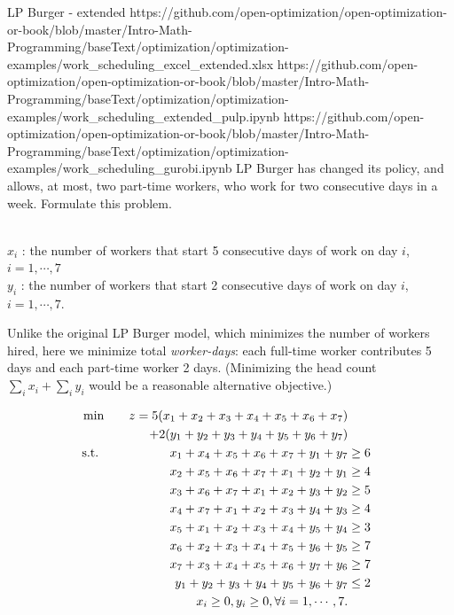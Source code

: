 \newpage
\begin{examplewithallcode}{LP Burger - extended}
{https://github.com/open-optimization/open-optimization-or-book/blob/master/Intro-Math-Programming/baseText/optimization/optimization-examples/work_scheduling_excel_extended.xlsx}
{https://github.com/open-optimization/open-optimization-or-book/blob/master/Intro-Math-Programming/baseText/optimization/optimization-examples/work_scheduling_extended_pulp.ipynb}
{https://github.com/open-optimization/open-optimization-or-book/blob/master/Intro-Math-Programming/baseText/optimization/optimization-examples/work_scheduling_gurobi.ipynb}
LP Burger has changed its policy, and allows, at most, two part-time workers, who work for two consecutive days in a week.  Formulate this problem.
\end{examplewithallcode}
\begin{solution}
 \\
$x_i$ : the number of workers that start 5 consecutive days of work on day $i$, $ i = 1,\cdots,7$ \\
$y_i$ : the number of workers that start 2 consecutive days of work on day $i$, $ i = 1,\cdots,7$.

Unlike the original LP Burger model, which minimizes the number of workers hired, here we minimize total \emph{worker-days}: each full-time worker contributes 5 days and each part-time worker 2 days. (Minimizing the head count $\sum_i x_i + \sum_i y_i$ would be a reasonable alternative objective.)

\smallskip {}
\begin{align*}
\min \quad && z = 5(x_1 + x_2 + x_3 + x_4 + x_5 + x_6 + x_7) \\
&& + 2(y_1 + y_2 + y_3 + y_4 + y_5 + y_6 + y_7) \nonumber \\
\text{ s.t. } \quad && x_1 + x_4 + x_5 + x_6 + x_7 + y_1 + y_7 &\ge 6 \\
&& x_2 + x_5 + x_6 + x_7 + x_1 + y_2 + y_1 &\ge 4 \\
&&           x_3 + x_6 + x_7 + x_1 + x_2 + y_3 + y_2 &\ge 5 \\
&&           x_4 + x_7 + x_1 + x_2 + x_3 + y_4 + y_3 &\ge 4 \\
&&           x_5 + x_1 + x_2 + x_3 + x_4 + y_5 + y_4 &\ge 3 \\
&&           x_6 + x_2 + x_3 + x_4 + x_5 + y_6 + y_5 &\ge 7 \\
&&           x_7 + x_3 + x_4 + x_5 + x_6 + y_7 + y_6 &\ge 7 \\
&&           y_1 + y_2 + y_3 + y_4 + y_5 + y_6 + y_7 &\le 2 \\
&&           x_i \ge 0, y_i \ge 0, \forall i = 1,\cdots,7.
\end{align*}
\end{solution}

